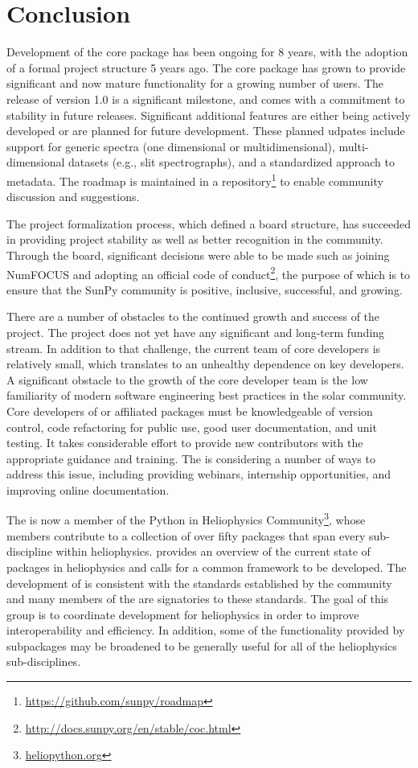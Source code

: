 \section{Conclusion}
\label{sec:conclusion}

Development of the \sunpypkg core package has been ongoing for 8 years, with the adoption of a formal project structure 5 years ago.
The core package has grown to provide significant and now mature functionality for a growing number of users.
The release of version 1.0 is a significant milestone, and comes with a commitment to stability in future releases.
Significant additional features are either being actively developed or are planned for future development.
These planned udpates include support for generic spectra (one dimensional or multidimensional), multi-dimensional datasets (e.g., slit spectrographs), and a standardized approach to metadata. The roadmap is maintained in a repository\footnote{\url{https://github.com/sunpy/roadmap}} to enable community discussion and suggestions.

The project formalization process, which defined a board structure, has succeeded in providing project stability as well as better recognition in the community.
Through the board, significant decisions were able to be made such as joining NumFOCUS and adopting an official code of conduct\footnote{\url{http://docs.sunpy.org/en/stable/coc.html}}, the purpose of which is to ensure that the SunPy community is positive, inclusive, successful, and growing.

There are a number of obstacles to the continued growth and success of the project.
The project does not yet have any significant and long-term funding stream.
In addition to that challenge, the current team of core developers is relatively small, which translates to an unhealthy dependence on key developers.
A significant obstacle to the growth of the core developer team is the low familiarity of modern software engineering best practices in the solar community.
Core developers of \sunpypkg or affiliated packages must be knowledgeable of version control, code refactoring for public use, good user documentation, and unit testing.
It takes considerable effort to provide new contributors with the appropriate guidance and training.
The \sunpyproj is considering a number of ways to address this issue, including providing webinars, internship opportunities, and improving online documentation.

The \sunpyproj is now a member of the Python in Heliophysics Community\footnote{\url{heliopython.org}}, whose members contribute to a collection of over fifty \python packages that span every sub-discipline within heliophysics.
\citet{snakes} provides an overview of the current state of \python packages in heliophysics and calls for a common framework to be developed.
The development of \sunpypkg is consistent with the standards established by the community \citep{pyhcStandards} and many members of the \sunpyproj are signatories to these standards.
The goal of this group is to coordinate \python development for heliophysics in order to improve interoperability and efficiency.
In addition, some of the functionality provided by \sunpypkg subpackages may be broadened to be generally useful for all of the heliophysics sub-disciplines.
